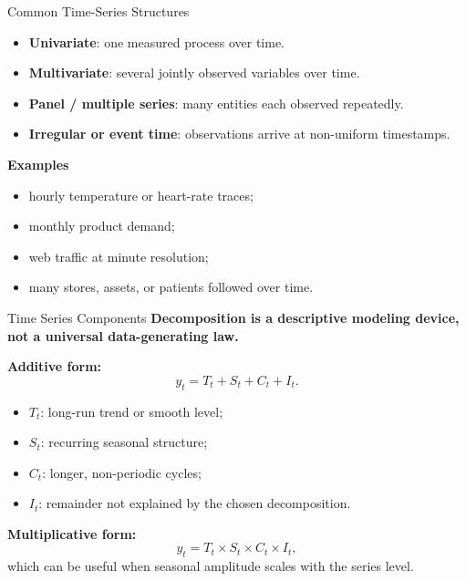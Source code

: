 \begin{frame}{Common Time-Series Structures}
\begin{itemize}
  \item \textbf{Univariate}: one measured process over time.
  \item \textbf{Multivariate}: several jointly observed variables over time.
  \item \textbf{Panel / multiple series}: many entities each observed repeatedly.
  \item \textbf{Irregular or event time}: observations arrive at non-uniform timestamps.
\end{itemize}

\textbf{Examples}
\begin{itemize}
  \item hourly temperature or heart-rate traces;
  \item monthly product demand;
  \item web traffic at minute resolution;
  \item many stores, assets, or patients followed over time.
\end{itemize}
\end{frame}


\begin{frame}{Time Series Components}
\textbf{Decomposition is a descriptive modeling device, not a universal data-generating law.}

\textbf{Additive form:}
\[
  y_t = T_t + S_t + C_t + I_t.
\]

\begin{itemize}
  \item $T_t$: long-run trend or smooth level;
  \item $S_t$: recurring seasonal structure;
  \item $C_t$: longer, non-periodic cycles;
  \item $I_t$: remainder not explained by the chosen decomposition.
\end{itemize}

\textbf{Multiplicative form:}
\[
  y_t = T_t \times S_t \times C_t \times I_t,
\]
which can be useful when seasonal amplitude scales with the series level.
\end{frame}

